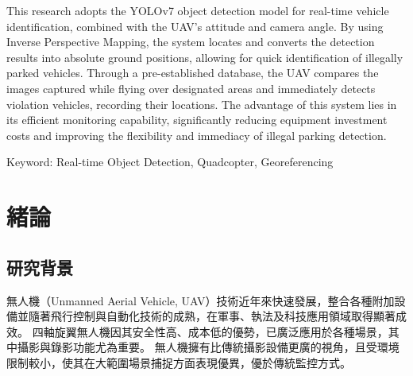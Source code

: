 \documentclass[12pt]{article}       %
\begin{document}
This research adopts the YOLOv7 object detection model for real-time vehicle identification, combined with the UAV's attitude and camera angle.
By using Inverse Perspective Mapping, the system locates and converts the detection results into absolute ground positions, allowing for quick identification of illegally parked vehicles.
Through a pre-established database, the UAV compares the images captured while flying over designated areas and immediately detects violation vehicles, recording their locations. The advantage of this system lies in its efficient monitoring capability, significantly reducing equipment investment costs and improving the flexibility and immediacy of illegal parking detection.

\vspace{1.5em}
\noindent Keyword: Real-time Object Detection, Quadcopter, Georeferencing
\newpage  %


\begin{center}
\tableofcontents  %
\thispagestyle{empty}  %
\end{center}

\newpage  %


\setcounter{page}{1}  %


\section{\centering 緒論}

\subsection{研究背景} 
\hspace{2em}
無人機（Unmanned Aerial Vehicle, UAV）技術近年來快速發展，整合各種附加設備並隨著飛行控制與自動化技術的成熟，在軍事、執法及科技應用領域取得顯著成效。
四軸旋翼無人機因其安全性高、成本低的優勢，已廣泛應用於各種場景，其中攝影與錄影功能尤為重要。
無人機擁有比傳統攝影設備更廣的視角，且受環境限制較小，使其在大範圍場景捕捉方面表現優異，優於傳統監控方式。
\end{document}
